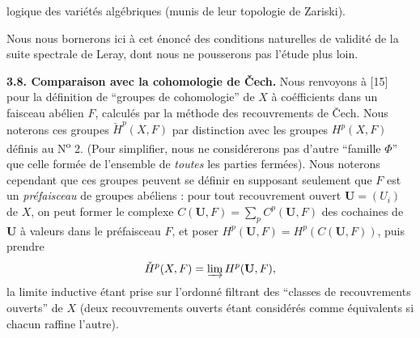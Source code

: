 
\noindent logique des variétés algébriques (munis de leur topologie de
Zariski).

Nous nous bornerons ici à cet énoncé des conditions naturelles de validité de
la suite spectrale de Leray, dont nous ne pousserons pas l'étude plus loin.

\textbf{3.8. Comparaison avec la cohomologie de Čech.} Nous renvoyons à [15]
pour la définition de ``groupes de cohomologie'' de $X$ à coéfficients dans un
faisceau abélien $F$, calculés par la méthode des recouvrements de Čech.
Nous noterons ces groupes $\check H^p(X,F)$ par distinction avec les groupes
$H^p(X,F)$ définis au N\textsuperscript{o} 2. (Pour simplifier, nous ne
considérerons pas d'autre ``famille $\Phi$'' que celle formée de l'ensemble de
\textit{toutes} les parties fermées). Nous noterons cependant que ces groupes peuvent
se définir en supposant seulement que $F$ est un \textit{préfaisceau} de
groupes abéliens :
pour tout recouvrement ouvert $\mathbf U=(U_i)$ de $X$, on peut former le
complexe
$C(\mathbf U,F)=\displaystyle\sum\limits_p C^p(\mathbf U,F)$
des cochaines de $\mathbf U$ à valeurs dans le préfaisceau $F$, et poser
$H^p(\mathbf U,F)=H^p(C(\mathbf U,F))$,
puis prendre
\[
\check H^p(X,F)=\varinjlim H^p(\mathbf U,F),
\]
la limite inductive étant prise sur l'ordonné filtrant des ``classes de
recouvrements ouverts'' de $X$ (deux recouvrements ouverts étant considérés
comme équivalents si chacun raffine l'autre).

